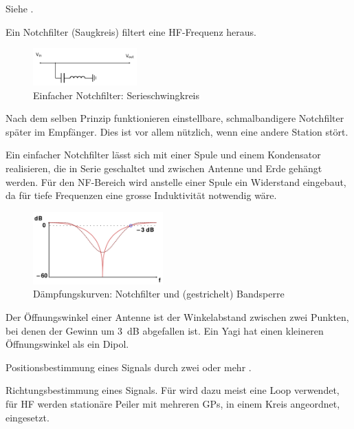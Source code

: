 {Siehe .}

{Ein Notchfilter (Saugkreis) filtert eine HF-Frequenz heraus.

\begin{figure}[h!]
 \centering
 \includegraphics[width=4cm]{./png/Amfu-Schema-Notchfilter.png}
 \caption{Einfacher Notchfilter: Serieschwingkreis}
 \label{fig:notchfilter}
\end{figure}

Nach dem selben Prinzip funktionieren einstellbare, schmalbandigere Notchfilter später im Empfänger. Dies ist vor allem nützlich, wenn eine andere Station stört.

Ein einfacher Notchfilter lässt sich mit einer Spule und einem Kondensator realisieren, die in Serie geschaltet und zwischen Antenne und Erde gehängt werden. Für den NF-Bereich wird anstelle einer Spule ein Widerstand eingebaut, da für tiefe Frequenzen eine grosse Induktivität notwendig wäre.

\begin{figure}[h!]
 \centering
 \includegraphics[width=5cm]{./png/Amfu-Notchfilter.png}
 \caption{Dämpfungskurven: Notchfilter und 
(gestrichelt) Bandsperre}
 \label{fig:notchfilterFreq}
\end{figure}
}

{Der Öffnungswinkel einer Antenne ist der Winkelabstand zwischen zwei Punkten, bei denen der Gewinn um 3 dB abgefallen ist. Ein Yagi hat einen kleineren Öffnungswinkel als ein Dipol.}

{Positionsbestimmung eines Signals durch zwei oder mehr .}

{Richtungsbestimmung eines Signals. Für  wird dazu meist eine Loop verwendet, für HF werden stationäre Peiler mit mehreren GPs, in einem Kreis angeordnet, eingesetzt.}

